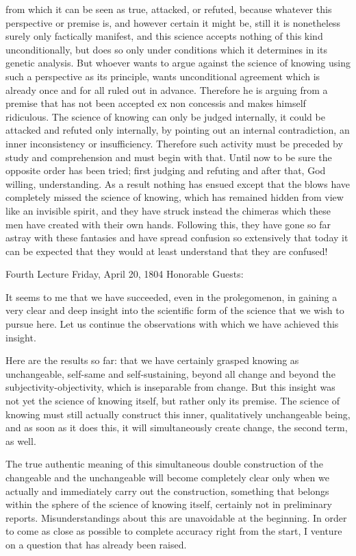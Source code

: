 from which it can be seen as true, attacked, or refuted,
because whatever this perspective or premise is,
and however certain it might be,
still it is nonetheless surely only factically manifest,
and this science accepts nothing of this kind unconditionally,
but does so only under conditions
which it determines in its genetic analysis.
But whoever wants to argue against the science
of knowing using such a perspective as its principle,
wants unconditional agreement which is already
once and for all ruled out in advance.
Therefore he is arguing from a premise that has not been accepted
{ex non concessis} and makes himself ridiculous.
The science of knowing can only be judged internally,
it could be attacked and refuted only internally,
by pointing out an internal contradiction,
an inner inconsistency or insufficiency.
Therefore such activity must be preceded
by study and comprehension and must begin with that.
Until now to be sure the opposite order has been tried;
first judging and refuting and after that, God willing, understanding.
As a result nothing has ensued except that the blows have
completely missed the science of knowing,
which has remained hidden from view like an invisible spirit,
and they have struck instead the chimeras which
these men have created with their own hands.
Following this, they have gone so far astray with these fantasies
and have spread confusion so extensively that today
it can be expected that they would at least
understand that they are confused!

Fourth Lecture
Friday, April 20, 1804
Honorable Guests:

It seems to me that we have succeeded,
even in the prolegomenon,
in gaining a very clear and deep insight
into the scientific form of the science
that we wish to pursue here.
Let us continue the observations
with which we have achieved this insight.

Here are the results so far:
that we have certainly grasped knowing
as unchangeable, self-same and self-sustaining,
beyond all change and beyond the subjectivity-objectivity,
which is inseparable from change.
But this insight was not yet the science of knowing itself,
but rather only its premise.
The science of knowing must still actually construct
this inner, qualitatively unchangeable being,
and as soon as it does this,
it will simultaneously create change,
the second term, as well.

The true authentic meaning of this
simultaneous double construction
of the changeable and the unchangeable
will become completely clear
only when we actually and immediately
carry out the construction,
something that belongs within the sphere
of the science of knowing itself,
certainly not in preliminary reports.
Misunderstandings about this are unavoidable at the beginning.
In order to come as close as possible to
complete accuracy right from the start,
I venture on a question that has already been raised.


